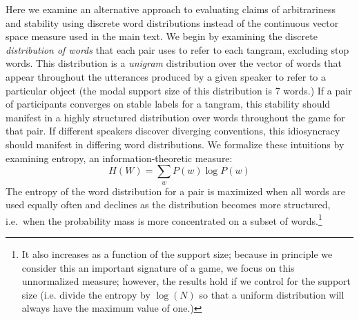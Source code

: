 \documentclass[alpha-refs]{wiley-article}
\begin{document}
Here we examine an alternative approach to evaluating claims of arbitrariness
 and stability using discrete word distributions instead of the continuous vector space measure used in the main text.
We begin by examining the discrete \emph{distribution of words} that each pair uses to refer to each tangram, excluding stop words.
This distribution is a \emph{unigram} distribution over the vector of words that appear throughout the utterances produced by a given speaker to refer to a particular object (the modal support size of this distribution is 7 words.)
If a pair of participants converges on stable labels for a tangram, this stability should manifest in a highly structured distribution over words throughout the game for that pair.
If different speakers discover diverging conventions, this idiosyncracy should manifest in differing word distributions.
We formalize these intuitions by examining entropy, an information-theoretic measure: $$H(W) = \sum_w P(w) \log P(w)$$
The entropy of the word distribution for a pair is maximized when all words are used equally often and declines as the distribution becomes more structured, i.e.~when the probability mass is more concentrated on a subset of words.\footnote{It also increases as a function of the support size; because in principle we consider this an important signature of a game, we focus on this unnormalized measure; however, the results hold if we control for the support size (i.e. divide the entropy by $\log(N)$ so that a uniform distribution will always have the maximum value of one.)}
\end{document}
